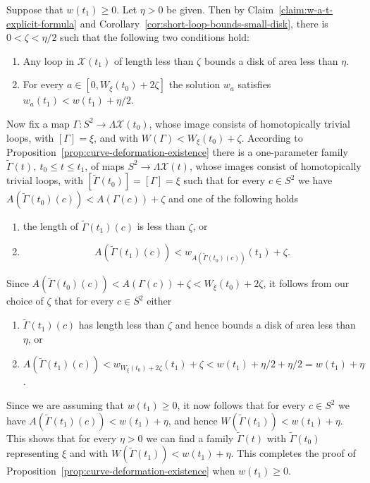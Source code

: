 Suppose that $w(t_1)\ge 0$. Let $\eta>0$ be given. Then by Claim~\ref{claim:w-a-t-explicit-formula}
and  Corollary~\ref{cor:short-loop-bounds-small-disk}, there is $0<\zeta<\eta/2$ such that the
following two conditions hold:
\begin{enumerate}
\item[(a)] Any loop in ${\mathcal X}(t_1)$ of length less than $\zeta$
bounds a disk of area less than $\eta$.
\item[(b)] For every $a\in [0,W_\xi(t_0)+2\zeta]$
the solution $w_{a}$ satisfies $w_{a}(t_1)<w(t_1)+\eta/2$.
\end{enumerate}

Now fix a map $\Gamma\colon S^2\to \Lambda{\mathcal X}(t_0)$, whose
image consists of homotopically trivial loops, with $[\Gamma]=\xi$,
and with $W(\Gamma)<W_\xi(t_0)+\zeta$. According to
Proposition~\ref{prop:curve-deformation-existence} there is a one-parameter family
$\widetilde\Gamma(t),\ t_0\le t\le t_1$, of maps $S^2\to
\Lambda{\mathcal X}(t)$, whose images consist of homotopically
trivial loops, with $[\widetilde\Gamma(t_0)]=[\Gamma]=\xi$ such that
for every $c\in S^2$ we have
$A(\widetilde\Gamma(t_0)(c))<A(\Gamma(c))+\zeta$ and one of the
following holds
\begin{enumerate}
\item[(i)] the length of $\widetilde\Gamma(t_1)(c)$ is less than $\zeta$, or
\item[(ii)] $$A(\widetilde\Gamma(t_1)(c))<
w_{A(\widetilde\Gamma(t_0)(c))}(t_1)+\zeta.$$
\end{enumerate}
Since $A(\widetilde\Gamma(t_0)(c))<A(\Gamma(c))+\zeta<W_\xi(t_0)+2\zeta$, it
follows from our choice of $\zeta$ that for every $c\in S^2$ either
\begin{enumerate}
\item[(a)] $\widetilde\Gamma(t_1)(c)$ has length less than $\zeta$ and hence bounds a disk
of area less than $\eta$, or
\item[(b)]
$A(\widetilde\Gamma(t_1)(c))<w_{W_\xi(t_0)+2\zeta}(t_1)+\zeta<w(t_1)+\eta/2+\eta/2=
w(t_1)+\eta$.
\end{enumerate}
Since we are assuming that $w(t_1)\ge 0$, it now follows that for
every $c\in S^2$ we have $A(\widetilde\Gamma(t_1)(c))<w(t_1)+\eta$,
and hence $W(\widetilde\Gamma(t_1))< w(t_1)+\eta$. This shows that
for every $\eta>0$ we can find a family $\widetilde\Gamma(t)$ with
$\widetilde\Gamma(t_0)$ representing $\xi$ and with
$W(\widetilde\Gamma(t_1))< w(t_1)+\eta$. This completes the proof of
Proposition~\ref{prop:curve-deformation-existence} when $w(t_1)\ge 0$.

